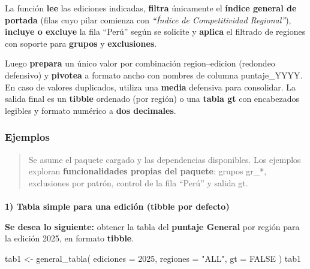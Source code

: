 \documentclass[
  11pt,
  letterpaper,
  DIV=11,
  numbers=noendperiod]{scrartcl}
\makeatletter
\let\oldparagraph\paragraph
\renewcommand{\paragraph}{
    \@ifstar
      \xxxParagraphStar
      \xxxParagraphNoStar
  }
\newcommand{\xxxParagraphStar}[1]{\oldparagraph*{#1}\mbox{}}
\newcommand{\xxxParagraphNoStar}[1]{\oldparagraph{#1}\mbox{}}
\newenvironment{Shaded}{\begin{snugshade}}{\end{snugshade}}
\newcommand{\AttributeTok}[1]{\textcolor[rgb]{0.40,0.45,0.13}{#1}}
\newcommand{\ConstantTok}[1]{\textcolor[rgb]{0.56,0.35,0.01}{#1}}
\newcommand{\DecValTok}[1]{\textcolor[rgb]{0.68,0.00,0.00}{#1}}
\newcommand{\FunctionTok}[1]{\textcolor[rgb]{0.28,0.35,0.67}{#1}}
\newcommand{\NormalTok}[1]{\textcolor[rgb]{0.00,0.23,0.31}{#1}}
\newcommand{\OtherTok}[1]{\textcolor[rgb]{0.00,0.23,0.31}{#1}}
\newcommand{\StringTok}[1]{\textcolor[rgb]{0.13,0.47,0.30}{#1}}
\makeatother
\begin{document}
La función \textbf{lee} las ediciones indicadas, \textbf{filtra}
únicamente el \textbf{índice general de portada} (filas cuyo pilar
comienza con \emph{``Índice de Competitividad Regional''}),
\textbf{incluye o excluye} la fila ``Perú'' según se solicite y
\textbf{aplica} el filtrado de regiones con soporte para \textbf{grupos}
y \textbf{exclusiones}.

Luego \textbf{prepara} un único valor por combinación region--edicion
(redondeo defensivo) y \textbf{pivotea} a formato ancho con nombres de
columna puntaje\_YYYY. En caso de valores duplicados, utiliza una
\textbf{media} defensiva para consolidar. La salida final es un
\textbf{tibble} ordenado (por región) o una \textbf{tabla gt} con
encabezados legibles y formato numérico a \textbf{dos decimales}.

\subsubsection{\texorpdfstring{\textbf{Ejemplos}}{Ejemplos}}\label{ejemplos}

\begin{quote}
Se asume el paquete cargado y las dependencias disponibles. Los ejemplos
exploran \textbf{funcionalidades propias del paquete}: grupos gr\_*,
exclusiones por patrón, control de la fila ``Perú'' y salida gt.
\end{quote}

\paragraph{\texorpdfstring{\textbf{1) Tabla simple para una edición
(tibble por
defecto)}}{1) Tabla simple para una edición (tibble por defecto)}}\label{tabla-simple-para-una-ediciuxf3n-tibble-por-defecto}

\textbf{Se desea lo siguiente:} obtener la tabla del \textbf{puntaje
General} por región para la edición 2025, en formato \textbf{tibble}.

\begin{Shaded}
\begin{Highlighting}[]
\NormalTok{tab1 }\OtherTok{\textless{}{-}} \FunctionTok{general\_tabla}\NormalTok{(}
  \AttributeTok{ediciones =} \DecValTok{2025}\NormalTok{,}
  \AttributeTok{regiones  =} \StringTok{"ALL"}\NormalTok{,}
  \AttributeTok{gt        =} \ConstantTok{FALSE}
\NormalTok{)}
\NormalTok{tab1}
\end{Highlighting}
\end{Shaded}
\end{document}

